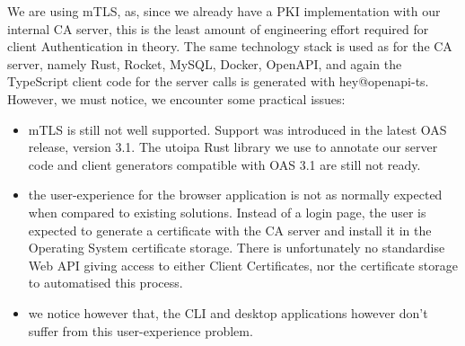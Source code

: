 We are using mTLS, as, since we already have a PKI implementation with our internal CA server, this is the least amount of engineering effort required for client Authentication in theory.
The same technology stack is used as for the CA server, namely Rust, Rocket, MySQL, Docker, OpenAPI, and again the TypeScript client code for the server calls is generated with hey@openapi-ts.
However, we must notice, we encounter some practical issues:
\begin{itemize}
    \item mTLS is still not well supported. Support was introduced in the latest OAS release, version 3.1. The utoipa Rust library we use to annotate our server code and client generators compatible with OAS 3.1 are still not ready.
    \item the user-experience for the browser application is not as normally expected when compared to existing solutions. Instead of a login page, the user is expected to generate a certificate with the CA server and install it in the Operating System certificate storage. There is unfortunately no standardise Web API giving access to either Client Certificates, nor the certificate storage to automatised this process.
    \item we notice however that, the CLI and desktop applications however don't suffer from this user-experience problem.
\end{itemize}









